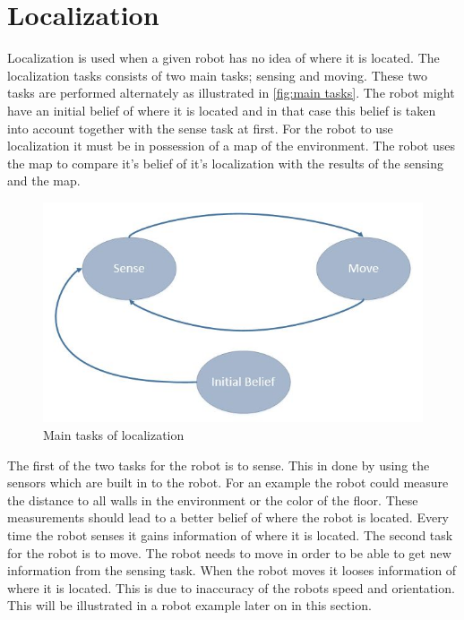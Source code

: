 
\section{Localization} %
\label{sec:localization}

Localization is used when a given robot has no idea of where it is located. The localization tasks consists of two main tasks; sensing and moving. These two tasks are performed alternately as illustrated in \autoref{fig:main tasks}. The robot might have an initial belief of where it is located and in that case this belief is taken into account together with the sense task at first. For the robot to use localization it must be in possession of a map of the environment. The robot uses the map to compare it's belief of it's localization with the results of the sensing and the map.\\

\begin{figure}[h]
\centering
\includegraphics[scale=0.45]{images/SenseMoveInitialBelief}
\caption{Main tasks of localization}
\label{fig:main tasks}
\end{figure}



The first of the two tasks for the robot is to sense. This in done by using the sensors which are built in to the robot. For an example the robot could measure the distance to all walls in the environment or the color of the floor. These measurements should lead to a better belief of where the robot is located. Every time the robot senses it gains information of where it is located. The second task for the robot is to move. The robot needs to move in order to be able to get new information from the sensing task. When the robot moves it looses information of where it is located. This is due to inaccuracy of the robots speed and orientation. This will be illustrated in a robot example later on in this section.\\

